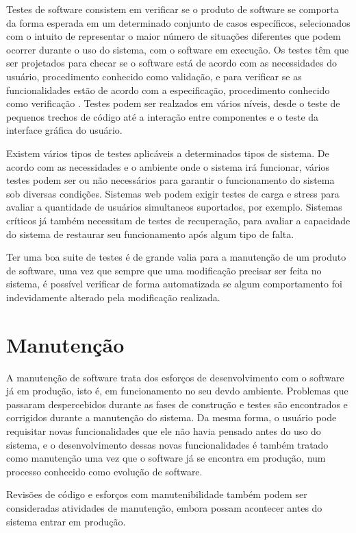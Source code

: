 Testes de software consistem em verificar se o produto de software se comporta da forma esperada em um determinado conjunto de casos específicos, selecionados com o intuito de representar o maior número de situações diferentes que podem ocorrer durante o uso do sistema, com o software em execução. Os testes têm que ser projetados para checar se o software está de acordo com as necessidades do usuário, procedimento conhecido como validação, e para verificar se as funcionalidades estão de acordo com a especificação, procedimento conhecido como verificação \cite{swebok}. Testes podem ser realzados em vários níveis, desde o teste de pequenos trechos de código até a interação entre componentes e o teste da interface gráfica do usuário.

Existem vários tipos de testes aplicáveis a determinados tipos de sistema. De acordo com as necessidades e o ambiente onde o sistema irá funcionar, vários testes podem ser ou não necessários para garantir o funcionamento do sistema sob diversas condições. Sistemas web podem exigir testes de carga e stress para avaliar a quantidade de usuários simultaneos suportados, por exemplo. Sistemas críticos já também necessitam de testes de recuperação, para avaliar a capacidade do sistema de restaurar seu funcionamento após algum tipo de falta.

Ter uma boa suite de testes é de grande valia para a manutenção de um produto de software, uma vez que sempre que uma modificação precisar ser feita no sistema, é possível verificar de forma automatizada se algum comportamento foi indevidamente alterado pela modificação realizada.

\section{Manutenção}

A manutenção de software trata dos esforços de desenvolvimento com o software já em produção, isto é, em funcionamento no seu devdo ambiente. Problemas que passaram despercebidos durante as fases de construção e testes são encontrados e corrigidos durante a manutenção do sistema. Da mesma forma, o usuário pode requisitar novas funcionalidades que ele não havia pensado antes do uso do sistema, e o desenvolvimento dessas novas funcionalidades é também tratado como manutenção uma vez que o software já se encontra em produção, num processo conhecido como evolução de software. 

Revisões de código e esforços com manutenibilidade também podem ser consideradas atividades de manutenção, embora possam acontecer antes do sistema entrar em produção.

